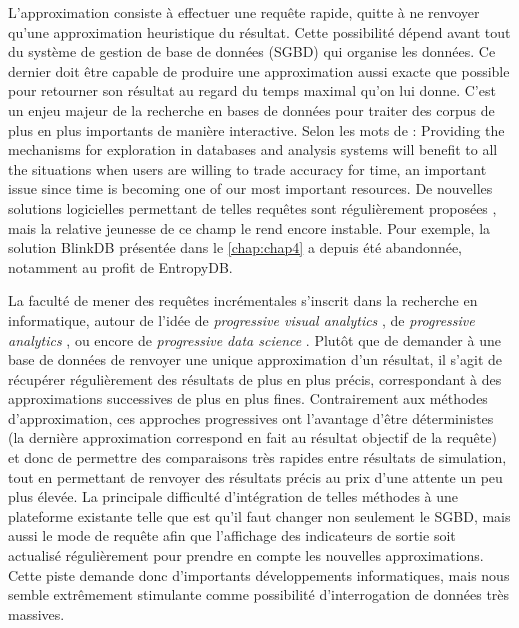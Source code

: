 L'approximation consiste à effectuer une requête rapide, quitte à ne renvoyer qu'une approximation heuristique du résultat.
Cette possibilité dépend avant tout du système de gestion de base de données (SGBD) qui organise les données. Ce dernier doit être capable de produire une approximation aussi exacte que possible pour retourner son résultat au regard du temps maximal qu'on lui donne.
C'est un enjeu majeur de la recherche en bases de données pour traiter des corpus de plus en plus importants de manière interactive.
Selon les mots de \textcite[7]{fekete_visual_2013} :
	\og Providing the mechanisms for exploration in databases and analysis systems will benefit to all the situations when users are willing to trade accuracy for time, an important issue since time is becoming one of our most important resources\fg{}.
De nouvelles solutions logicielles permettant de telles requêtes sont régulièrement proposées \autocite[par exemple EntropyDB, de ][]{orr_entropydb_2019}, mais la relative jeunesse de ce champ le rend encore instable.
Pour exemple, la solution BlinkDB \autocite{agarwal_blinkdb_2013} présentée dans le \cref{chap:chap4} a depuis été abandonnée, notamment au profit de EntropyDB.

La faculté de mener des requêtes incrémentales s'inscrit dans la recherche en informatique, autour de l'idée de \og \textit{progressive visual analytics}\fg{} \autocite{6876049}, de \og \textit{progressive analytics}\fg{} \autocite{fekete_progressive_2016}, ou encore de \og \textit{progressive data science}\fg{} \autocite{turkay_progressive_2018}.
Plutôt que de demander à une base de données de renvoyer une unique approximation d'un résultat, il s'agit de récupérer régulièrement des résultats de plus en plus précis, correspondant à des approximations successives de plus en plus fines.
Contrairement aux méthodes d'approximation, ces approches \og progressives\fg{} ont l'avantage d'être déterministes (la dernière approximation correspond en fait au résultat \og objectif\fg{} de la requête) et donc de permettre des comparaisons très rapides entre résultats de simulation, tout en permettant de renvoyer des résultats précis au prix d'une attente un peu plus élevée.
La principale difficulté d'intégration de telles méthodes à une plateforme existante telle que \simedb{} est qu'il faut changer non seulement le SGBD, mais aussi le mode de requête afin que l'affichage des indicateurs de sortie soit actualisé régulièrement pour prendre en compte les nouvelles approximations.
Cette piste demande donc d'importants développements informatiques, mais nous semble extrêmement stimulante comme possibilité d'interrogation de données très massives.

